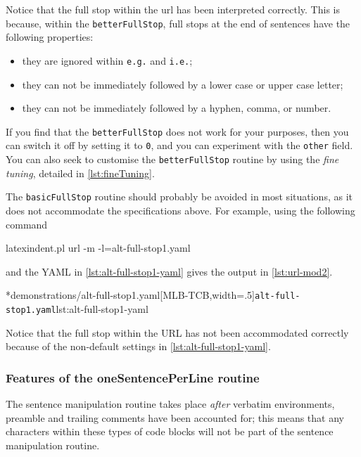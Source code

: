 	Notice that the full stop within the url has been interpreted correctly. This is because,
	within the \texttt{betterFullStop}, full stops at the end of sentences have the
	following properties:
	\begin{itemize}
		\item they are ignored within \texttt{e.g.} and \texttt{i.e.};
		\item they can not be immediately followed by a lower case or upper case letter;
		\item they can not be immediately followed by a hyphen, comma, or number.
	\end{itemize}
	If you find that the \texttt{betterFullStop} does not work for your purposes, then
	you can switch it off by setting it to \texttt{0}, and you can
	experiment with the \texttt{other}
	field.%
	 You can also seek
	to customise the \texttt{betterFullStop} routine by using the
	\emph{fine tuning}, detailed in \vref{lst:fineTuning}.

	The \texttt{basicFullStop} routine should probably be avoided in most situations, as
	it does not accommodate the specifications above. For example, using the following
	command
	\begin{commandshell}
latexindent.pl url -m -l=alt-full-stop1.yaml
\end{commandshell}
	and the YAML in \cref{lst:alt-full-stop1-yaml} gives the output in
	\cref{lst:url-mod2}.

	\begin{cmhtcbraster}[ raster left skip=-3.5cm,
			raster right skip=-2cm,
			raster force size=false,
			raster column 1/.style={add to width=.1\textwidth},
			raster column skip=.06\linewidth]
		\cmhlistingsfromfile[style=yaml-LST]*{demonstrations/alt-full-stop1.yaml}[MLB-TCB,width=.5\textwidth]{\texttt{alt-full-stop1.yaml}}{lst:alt-full-stop1-yaml}
	\end{cmhtcbraster}

	Notice that the full stop within the URL has not been accommodated correctly because of
	the non-default settings in \cref{lst:alt-full-stop1-yaml}.

\subsubsection{Features of the oneSentencePerLine routine}
	The sentence manipulation routine takes place \emph{after} verbatim
	environments, preamble and trailing comments have been accounted for; this means that any
	characters within these types of code blocks will not be part of the sentence
	manipulation routine.

